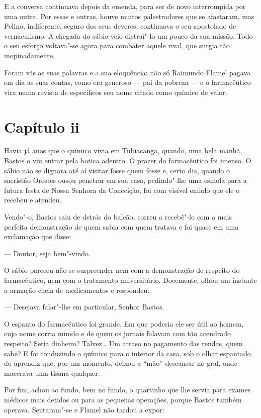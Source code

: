 E a conversa continuava depois da emenda, para ser de novo interrompida
por uma outra. Por essas e outras, houve muitos palestradores que se
afastaram, mas Pelino, indiferente, seguro dos seus deveres, continuava
o seu apostolado de vernaculismo. A chegada do sábio veio distraí"-lo um
pouco da sua missão. Todo o seu esforço voltava"-se agora para combater
aquele rival, que surgia tão inopinadamente.

Foram vãs as suas palavras e a sua eloquência: não só Raimundo Flamel
pagava em dia as suas contas, como era generoso --- pai da pobreza --- e
o farmacêutico vira numa revista de específicos seu nome citado como
químico de valor.

\section*{Capítulo ii}

Havia já anos que o químico vivia em Tubiacanga, quando, uma bela manhã,
Bastos o viu entrar pela botica adentro. O prazer do farmacêutico foi
imenso. O sábio não se dignara até aí visitar fosse quem fosse e, certo
dia, quando o sacristão Orestes ousou penetrar em sua casa, pedindo"-lhe
uma esmola para a futura festa de Nossa Senhora da Conceição, foi com
visível enfado que ele o recebeu e atendeu.

Vendo"-o, Bastos saiu de detrás do balcão, correu a recebê"-lo com a mais
perfeita demonstração de quem sabia com quem tratava e foi quase em uma
exclamação que disse:

--- Doutor, seja bem"-vindo.

O sábio pareceu não se surpreender nem com a demonstração de respeito do
farmacêutico, nem com o tratamento universitário. Docemente, olhou um
instante a armação cheia de medicamentos e respondeu:

--- Desejava falar"-lhe em particular, Senhor Bastos.

O espanto do farmacêutico foi grande. Em que poderia ele ser útil ao
homem, cujo nome corria mundo e de quem os jornais falavam com tão
acendrado respeito? Seria dinheiro? Talvez\ldots{} Um atraso no pagamento das
rendas, quem sabe? E foi conduzindo o químico para o interior da casa,
sob o olhar espantado do aprendiz que, por um momento, deixou a ``mão''
descansar no gral, onde macerava uma tisana qualquer.

Por fim, achou ao fundo, bem no fundo, o quartinho que lhe servia para
exames médicos mais detidos ou para as pequenas operações, porque Bastos
também operava. Sentaram"-se e Flamel não tardou a expor:

